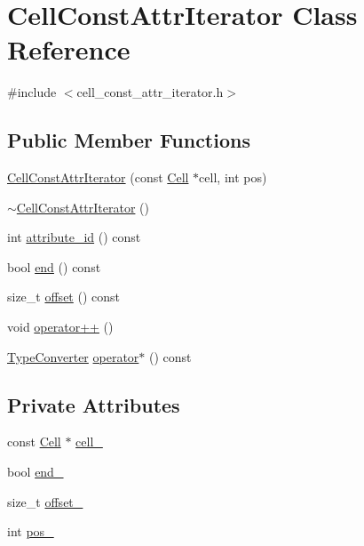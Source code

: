 \hypertarget{classCellConstAttrIterator}{}\section{Cell\+Const\+Attr\+Iterator Class Reference}
\label{classCellConstAttrIterator}


{\ttfamily \#include $<$cell\+\_\+const\+\_\+attr\+\_\+iterator.\+h$>$}

\subsection*{Public Member Functions}
\begin{DoxyCompactItemize}
\item 
\hyperlink{classCellConstAttrIterator_a7be7b2fe38d47b8bdc46354d9873e34e}{Cell\+Const\+Attr\+Iterator} (const \hyperlink{classCell}{Cell} $\ast$cell, int pos)
\item 
\hyperlink{classCellConstAttrIterator_aa5c73c0c175075ce218b3573cd31e81f}{$\sim$\+Cell\+Const\+Attr\+Iterator} ()
\item 
int \hyperlink{classCellConstAttrIterator_ab23f2d61798b06451feea176b4e4a5c7}{attribute\+\_\+id} () const 
\item 
bool \hyperlink{classCellConstAttrIterator_ac6f2d4bd26c9a26b7920539a3eaafe3e}{end} () const 
\item 
size\+\_\+t \hyperlink{classCellConstAttrIterator_a06503f5fa455254d16d1553114629bba}{offset} () const 
\item 
void \hyperlink{classCellConstAttrIterator_a50caf8b0edb10cc5ab33b47e53fd58fb}{operator++} ()
\item 
\hyperlink{classTypeConverter}{Type\+Converter} \hyperlink{classCellConstAttrIterator_aaf406e4ae838cff8dbf327ff86ed0806}{operator$\ast$} () const 
\end{DoxyCompactItemize}
\subsection*{Private Attributes}
\begin{DoxyCompactItemize}
\item 
const \hyperlink{classCell}{Cell} $\ast$ \hyperlink{classCellConstAttrIterator_a309ed9729603c9ca02d30d49fd86127d}{cell\+\_\+}
\item 
bool \hyperlink{classCellConstAttrIterator_a5cddd3f26d2b32c28b23c5062ef0621c}{end\+\_\+}
\item 
size\+\_\+t \hyperlink{classCellConstAttrIterator_abd2a184c0ccb6214831f2b156cf83bca}{offset\+\_\+}
\item 
int \hyperlink{classCellConstAttrIterator_aa223116556fa8e1bd25d31d1b8f1a01f}{pos\+\_\+}
\end{DoxyCompactItemize}


